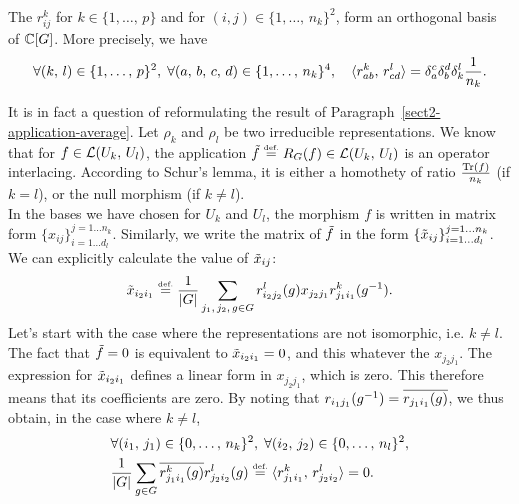 \begin{thm}
The $ r_{ij}^k $ for $ k \in \{1, \ldots, \, p\} $ and for $ (i, j) \in \{1, \ldots, \, n_k\}^2 $, form an orthogonal basis of $ \mathbb{C} [G] $. More precisely, we have
\begin{equation*}
\forall (k, \, l) \in \{1, \ldots, \, p\}^2, \; \forall (a, \, b, \, c, \, d) \in \{1, \ldots, \, n_k\}^4, \quad \langle r_{ab}^k,\,r_{cd }^l\rangle = \delta_a^c \delta_b^d \delta_k^l \frac{1}{n_k}.
\end{equation*}
\end{thm}
\begin{proofnoqed}
 It is in fact a question of reformulating the result of Paragraph~\ref{sect2-application-average}. Let $ \rho_k $ and $ \rho_l $ be two irreducible representations. We know that for $ f \in \mathcal{L} (U_k, \, U_l) $, the application $ \tilde{f} \stackrel{\mbox{\upshape\tiny def.}}{=} R_G (f) \in \mathcal{L} (U_k, \, U_l) $ is an operator interlacing. According to Schur's lemma, it is either a homothety of ratio $ \frac{\operatorname{Tr} (f)}{n_k} $ (if $ k = l $), or the null morphism (if $ k \neq l $). \\In the bases we have chosen for $ U_k $ and $ U_l $, the morphism $ f $ is written in matrix form $ \{x_{ij}\}_{i = 1 \ldots d_l}^{j = 1 \ldots n_k} $. Similarly, we write the matrix of $ \tilde{f} $ in the form $ \{\tilde{x}_{ij}\}_{i = 1 \ldots d_l}^{j = 1 \ldots n_k} $. We can explicitly calculate the value of $ \tilde{x}_{ij} $:
\begin{equation}
\label{eq-orth-functions-coord-interm}
\tilde{x}_{i_2 i_1} \stackrel{\mbox{\upshape\tiny def.}}{=} \frac{1}{|G|} \sum_{j_1, \, j_2, \, g \in G}{r_{i_2 j_2}^l (g) x_{j_2 j_1} r_{j_1 i_1}^k (g^{-1})}.
\end{equation}
Let's start with the case where the representations are not isomorphic, i.e. $ k \neq l $. The fact that $ \tilde{f} = 0 $ is equivalent to $ \tilde{x}_{i_2 i_1} = 0 $, and this whatever the $ x_{j_2 j_1} $. The expression for $ \tilde{x}_{i_2 i_1} $ defines a linear form in $ x_{j_2 j_1} $, which is zero. This therefore means that its coefficients are zero. By noting that $ r_{i_1 j_1} (g^{-1}) = \overline{r_{j_1 i_1} (g)} $, we thus obtain, in the case where $ k \neq l $,
\begin{equation*}
\begin{split}
& \forall (i_1, \, j_1) \in \{0, \ldots, \, n_k\}^2, \; \forall (i_2, \, j_2) \in \{0, \ldots, \, n_l\}^2, \\
& \frac{1}{|G|} \sum_{g \in G}{\ol{r_{j_1 i_1}^k (g)} r_{j_2 i_2}^l (g)} \eqdef \dotp{ r_{j_1 i_1}^k}{r_{j_2 i_2}^l} = 0.

\end{split}
\end{equation*}
\end{proofnoqed}
